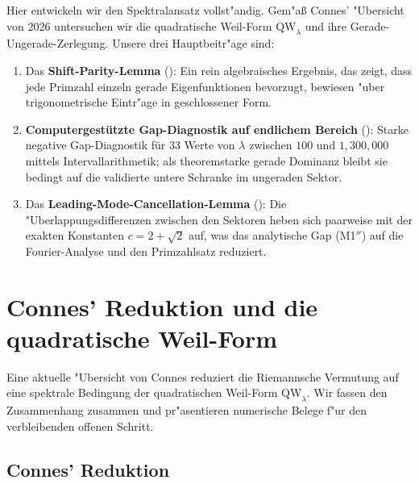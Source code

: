 ﻿\documentclass[12pt,a4paper]{article}
\theoremstyle{definition}
\theoremstyle{remark}
\begin{document}
Hier entwickeln wir den Spektralansatz vollst"andig. Gem"a\ss{} Connes' "Ubersicht von 2026 \cite{Connes2026} untersuchen wir die quadratische Weil-Form $\mathrm{QW}_\lambda$ und ihre Gerade-Ungerade-Zerlegung. Unsere drei Hauptbeitr"age sind:
\begin{enumerate}
  \item Das \textbf{Shift-Parity-Lemma} (): Ein rein algebraisches Ergebnis, das zeigt, dass jede Primzahl einzeln gerade Eigenfunktionen bevorzugt, bewiesen "uber trigonometrische Eintr"age in geschlossener Form.
  \item \textbf{Computergestützte Gap-Diagnostik auf endlichem Bereich} (): Starke negative Gap-Diagnostik für $33$ Werte von $\lambda$ zwischen $100$ und $1{,}300{,}000$ mittels Intervallarithmetik; als theoremstarke gerade Dominanz bleibt sie bedingt auf die validierte untere Schranke im ungeraden Sektor.
  \item Das \textbf{Leading-Mode-Cancellation-Lemma} (): Die "Uberlappungsdifferenzen zwischen den Sektoren heben sich paarweise mit der exakten Konstanten $c = 2 + \sqrt{2}$ auf, was das analytische Gap (M1$''$) auf die Fourier-Analyse und den Primzahlsatz reduziert.
\end{enumerate}


\section{Connes' Reduktion und die quadratische Weil-Form}
\label{sec:connes}

Eine aktuelle "Ubersicht von Connes \cite{Connes2026} reduziert die Riemannsche Vermutung auf eine spektrale Bedingung der quadratischen Weil-Form $\mathrm{QW}_\lambda$. Wir fassen den Zusammenhang zusammen und pr"asentieren numerische Belege f"ur den verbleibenden offenen Schritt.

\subsection{Connes' Reduktion}
\end{document}
